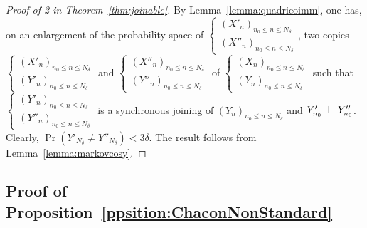 \documentclass[12pt,a4paper]{article}
\begin{document}
\begin{proof}[Proof of 2 in Theorem~\ref{thm:joinable}]
By Lemma~\ref{lemma:quadricoimm}, 
one has, on an enlargement of the probability space of 
$\left\{\begin{smallmatrix} {(X'_n)}_{n_0 \leq n \leq N_\delta} \\ 
{(X''_n)}_{n_0 \leq n \leq N_\delta}
\end{smallmatrix}\right.$, two copies 
$\left\{\begin{smallmatrix} {(X'_n)}_{n_0 \leq n \leq N_\delta} \\ 
{(Y'_n)}_{n_0 \leq n \leq N_\delta}
\end{smallmatrix}\right.$ and 
$\left\{\begin{smallmatrix} {(X''_n)}_{n_0 \leq n \leq N_\delta} \\ 
{(Y''_n)}_{n_0 \leq n \leq N_\delta}
\end{smallmatrix}\right.$
of 
$\left\{\begin{smallmatrix} {(X_n)}_{n_0 \leq n \leq N_\delta} \\ 
{(Y_n)}_{n_0 \leq n \leq N_\delta}
\end{smallmatrix}\right.$ 
such that 
$\left\{\begin{smallmatrix} {(Y'_n)}_{n_0 \leq n \leq N_\delta} \\ 
{(Y''_n)}_{n_0 \leq n \leq N_\delta}
\end{smallmatrix}\right.$ is a synchronous joining of 
${(Y_n)}_{n_0 \leq n \leq N_\delta}$ and 
$Y'_{n_0} \indep Y''_{n_0}$. 
Clearly,  $\Pr(Y'_{N_\delta} \neq Y''_{N_\delta}) < 3\delta$. 
The result follows from Lemma~\ref{lemma:markovcosy}.
\end{proof}


\subsection{Proof of Proposition~\ref{ppsition:ChaconNonStandard}}





\end{document}
